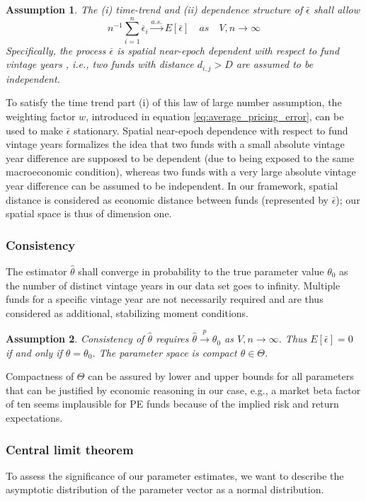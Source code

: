 \documentclass[12pt]{article}
\newtheorem{assume}{Assumption}
\begin{document}
\begin{assume}
	The (i) time-trend and (ii) dependence structure of $\bar{\epsilon}$ shall allow
	\[
	n^{-1} \sum_{i=1}^n \overline{\epsilon}_i \overset{a.s.}\to E[\bar{\epsilon}]
	\quad {as} \quad V,n \to \infty
	\]
	Specifically, the process $\overline{\epsilon}$ is spatial near-epoch dependent with respect to fund vintage years \citep{JP12}, i.e., two funds with distance $d_{i,j}>D$ are assumed to be independent.
\end{assume}
To satisfy the time trend part (i) of this law of large number assumption, the weighting factor $w$, introduced in equation \ref{eq:average_pricing_error}, can be used to make $\bar{\epsilon}$ stationary.
Spatial near-epoch dependence with respect to fund vintage years formalizes the idea that two funds with a small absolute vintage year difference are supposed to be dependent (due to being exposed to the same macroeconomic condition), whereas two funds with a very large absolute vintage year difference can be assumed to be independent.
In our framework, spatial distance is considered as economic distance between funds (represented by $\bar{\epsilon}$); our spatial space is thus of dimension one.

\subsubsection{Consistency}
The estimator $\hat{\theta}$ shall converge in probability to the true parameter value $\theta_0$ as the number of distinct vintage years in our data set goes to infinity.
Multiple funds for a specific vintage year are not necessarily required and are thus considered as additional, stabilizing moment conditions.

\begin{assume}
 Consistency of $\hat{\theta}$ requires $\hat{\theta} \overset{p}{\to} \theta_0$ as $V,n \to \infty$.
 Thus $E[\bar{\epsilon}]=0$ if and only if $\theta=\theta_0$.
 The parameter space is compact $\theta \in \Theta$.
\end{assume}
Compactness of $\Theta$ can be assured by lower and upper bounds for all parameters that can be justified by economic reasoning in our case, e.g., a market beta factor of ten seems implausible for PE funds because of the implied risk and return expectations.

\subsubsection{Central limit theorem}
To assess the significance of our parameter estimates, we want to describe the asymptotic distribution of the parameter vector as a normal distribution.
\end{document}

